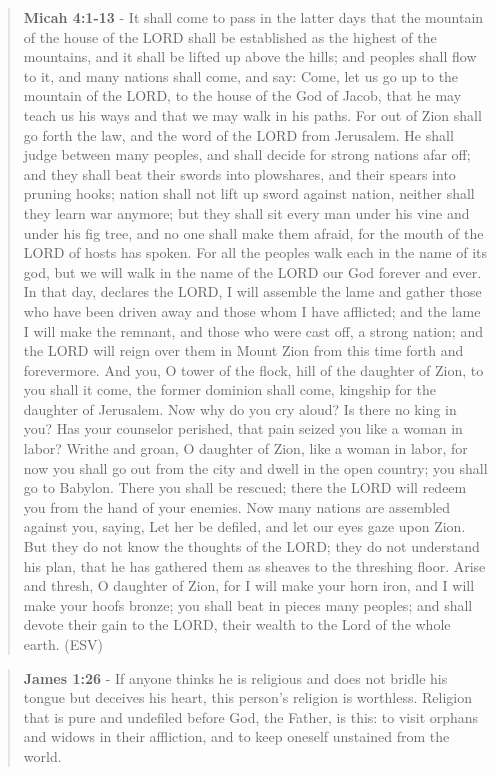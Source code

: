 \documentclass[11pt]{article}
\begin{document}
\begin{quote}
\textbf{Micah 4:1-13} - It shall come to pass in the latter days that the mountain of the house of the LORD shall be established as the highest of the mountains, and it shall be lifted up above the hills; and peoples shall flow to it, and many nations shall come, and say: Come, let us go up to the mountain of the LORD, to the house of the God of Jacob, that he may teach us his ways and that we may walk in his paths. For out of Zion shall go forth the law, and the word of the LORD from Jerusalem. He shall judge between many peoples, and shall decide for strong nations afar off; and they shall beat their swords into plowshares, and their spears into pruning hooks; nation shall not lift up sword against nation, neither shall they learn war anymore; but they shall sit every man under his vine and under his fig tree, and no one shall make them afraid, for the mouth of the LORD of hosts has spoken. For all the peoples walk each in the name of its god, but we will walk in the name of the LORD our God forever and ever. In that day, declares the LORD, I will assemble the lame and gather those who have been driven away and those whom I have afflicted; and the lame I will make the remnant, and those who were cast off, a strong nation; and the LORD will reign over them in Mount Zion from this time forth and forevermore. And you, O tower of the flock, hill of the daughter of Zion, to you shall it come, the former dominion shall come, kingship for the daughter of Jerusalem. Now why do you cry aloud? Is there no king in you? Has your counselor perished, that pain seized you like a woman in labor? Writhe and groan, O daughter of Zion, like a woman in labor, for now you shall go out from the city and dwell in the open country; you shall go to Babylon. There you shall be rescued; there the LORD will redeem you from the hand of your enemies. Now many nations are assembled against you, saying, Let her be defiled, and let our eyes gaze upon Zion. But they do not know the thoughts of the LORD; they do not understand his plan, that he has gathered them as sheaves to the threshing floor. Arise and thresh, O daughter of Zion, for I will make your horn iron, and I will make your hoofs bronze; you shall beat in pieces many peoples; and shall devote their gain to the LORD, their wealth to the Lord of the whole earth. (ESV)
\end{quote}

\begin{quote}
\textbf{James 1:26} - If anyone thinks he is religious and does not bridle his tongue but deceives his heart, this person's religion is worthless. Religion that is pure and undefiled before God, the Father, is this: to visit orphans and widows in their affliction, and to keep oneself unstained from the world.
\end{quote}
\end{document}
